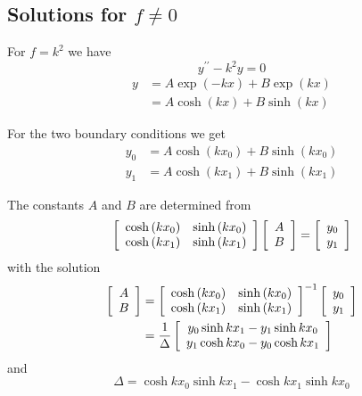 \documentclass[12pt]{article}%
\begin{document}
\subsection{Solutions for $f\neq0$}

For $f=k^{2}$ we have%
\begin{equation}
y^{\prime\prime}-k^{2}y=0
\end{equation}%
\begin{align}
y  &  =A\exp\left(  -kx\right)  +B\exp\left(  kx\right) \\
&  =A\cosh\left(  kx\right)  +B\sinh\left(  kx\right)
\end{align}


For the two boundary conditions we get%
\begin{align}
y_{0}  &  =A\cosh\left(  kx_{0}\right)  +B\sinh\left(  kx_{0}\right) \\
y_{1}  &  =A\cosh\left(  kx_{1}\right)  +B\sinh\left(  kx_{1}\right)
\end{align}


The constants $A$ and $B$ are determined from%
\begin{equation}
\left[
\begin{array}
[c]{cc}%
\cosh\left(  kx_{0}\right)  & \sinh\left(  kx_{0}\right) \\
\cosh\left(  kx_{1}\right)  & \sinh\left(  kx_{1}\right)
\end{array}
\right]  \left[
\begin{array}
[c]{c}%
A\\
B
\end{array}
\right]  =\left[
\begin{array}
[c]{c}%
y_{0}\\
y_{1}%
\end{array}
\right]
\end{equation}
with the solution%
\begin{align}
\left[
\begin{array}
[c]{c}%
A\\
B
\end{array}
\right]   &  =\left[
\begin{array}
[c]{cc}%
\cosh\left(  kx_{0}\right)  & \sinh\left(  kx_{0}\right) \\
\cosh\left(  kx_{1}\right)  & \sinh\left(  kx_{1}\right)
\end{array}
\right]  ^{-1}\left[
\begin{array}
[c]{c}%
y_{0}\\
y_{1}%
\end{array}
\right] \\
&  =\frac{1}{\Delta}\left[
\begin{array}
[c]{c}%
y_{0}\sinh kx_{1}-y_{1}\sinh kx_{0}\\
y_{1}\cosh kx_{0}-y_{0}\cosh kx_{1}%
\end{array}
\right]  \allowbreak
\end{align}
$\allowbreak$and
\begin{equation}
\Delta=\cosh kx_{0}\sinh kx_{1}-\cosh kx_{1}\sinh kx_{0}%
\end{equation}
$\allowbreak$
\end{document}
